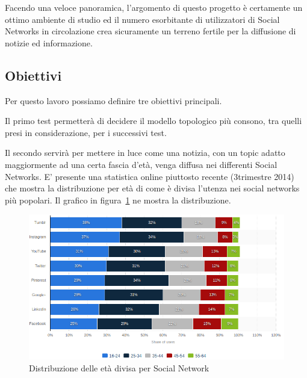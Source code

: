 Facendo una veloce panoramica, l'argomento di questo progetto è certamente un ottimo ambiente di studio
ed il numero esorbitante di utilizzatori di Social Networks in circolazione crea sicuramente 
un terreno fertile per la diffusione di notizie ed informazione.




\vspace{5 mm}
\subsection{Obiettivi}
\label{section:obiettivi}
\vspace{3 mm}

Per questo lavoro possiamo definire tre obiettivi principali.

Il primo test permetterà di decidere il modello topologico più consono, tra quelli 
presi in considerazione, per i successivi test.

Il secondo servirà per mettere in luce come una notizia, 
con un topic adatto maggiormente ad una certa fascia d'età, venga diffusa nei differenti Social Networks.
E' presente una statistica online piuttosto recente (3\degree trimestre 2014) che mostra la distribuzione 
per età di come è divisa l'utenza nei social networks più popolari. 
Il grafico in figura~\ref{img:age_distribution_social} ne mostra la distribuzione.

\begin{figure}[!ht]
 \centerline{
  \includegraphics[width=1.0\textwidth]{img/age-distribution.png}
 }
\caption{Distribuzione delle età divisa per Social Network ~\cite{biblio:age_distribution_social}}
\label{img:age_distribution_social}
\end{figure}


